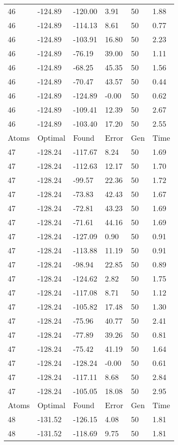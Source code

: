 \documentclass{report}
\begin{document}
\begin{appendix}
\begin{longtable}{llllll}
46 & -124.89 & -120.00 & 3.91 & 50 & 1.88 \\
46 & -124.89 & -114.13 & 8.61 & 50 & 0.77 \\
46 & -124.89 & -103.91 & 16.80 & 50 & 2.23 \\
46 & -124.89 & -76.19 & 39.00 & 50 & 1.11 \\
46 & -124.89 & -68.25 & 45.35 & 50 & 1.56 \\
46 & -124.89 & -70.47 & 43.57 & 50 & 0.44 \\
46 & -124.89 & -124.89 & -0.00 & 50 & 0.62 \\
46 & -124.89 & -109.41 & 12.39 & 50 & 2.67 \\
46 & -124.89 & -103.40 & 17.20 & 50 & 2.55 \\
Atoms & Optimal & Found & Error & Gen & Time \\
47 & -128.24 & -117.67 & 8.24 & 50 & 1.69 \\
47 & -128.24 & -112.63 & 12.17 & 50 & 1.70 \\
47 & -128.24 & -99.57 & 22.36 & 50 & 1.72 \\
47 & -128.24 & -73.83 & 42.43 & 50 & 1.67 \\
47 & -128.24 & -72.81 & 43.23 & 50 & 1.69 \\
47 & -128.24 & -71.61 & 44.16 & 50 & 1.69 \\
47 & -128.24 & -127.09 & 0.90 & 50 & 0.91 \\
47 & -128.24 & -113.88 & 11.19 & 50 & 0.91 \\
47 & -128.24 & -98.94 & 22.85 & 50 & 0.89 \\
47 & -128.24 & -124.62 & 2.82 & 50 & 1.75 \\
47 & -128.24 & -117.08 & 8.71 & 50 & 1.12 \\
47 & -128.24 & -105.82 & 17.48 & 50 & 1.30 \\
47 & -128.24 & -75.96 & 40.77 & 50 & 2.41 \\
47 & -128.24 & -77.89 & 39.26 & 50 & 0.81 \\
47 & -128.24 & -75.42 & 41.19 & 50 & 1.64 \\
47 & -128.24 & -128.24 & -0.00 & 50 & 0.61 \\
47 & -128.24 & -117.11 & 8.68 & 50 & 2.84 \\
47 & -128.24 & -105.05 & 18.08 & 50 & 2.95 \\
Atoms & Optimal & Found & Error & Gen & Time \\
48 & -131.52 & -126.15 & 4.08 & 50 & 1.81 \\
48 & -131.52 & -118.69 & 9.75 & 50 & 1.81 \\

\end{longtable}
\end{appendix}
\end{document}
